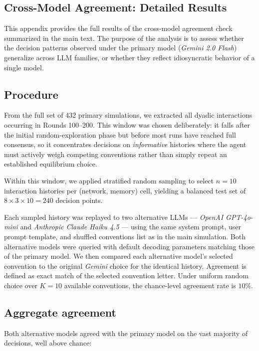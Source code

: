 \documentclass{article}
\begin{document}
\begin{appendices}
\section{Cross-Model Agreement: Detailed Results}
\label{app:cross_model_agreement}

This appendix provides the full results of the cross-model agreement check summarized in the main text. The purpose of the analysis is to assess whether the decision patterns observed under the primary model (\textit{Gemini 2.0 Flash}) generalize across LLM families, or whether they reflect idiosyncratic behavior of a single model.

\subsection*{Procedure}

From the full set of 432 primary simulations, we extracted all dyadic interactions occurring in Rounds 100--200. This window was chosen deliberately: it falls after the initial random-exploration phase but before most runs have reached full consensus, so it concentrates decisions on \emph{informative} histories where the agent must actively weigh competing conventions rather than simply repeat an established equilibrium choice.

Within this window, we applied stratified random sampling to select $n=10$ interaction histories per (network, memory) cell, yielding a balanced test set of $8 \times 3 \times 10 = 240$ decision points.

Each sampled history was replayed to two alternative LLMs --- \textit{OpenAI GPT-4o-mini} and \textit{Anthropic Claude Haiku 4.5} --- using the same system prompt, user prompt template, and shuffled conventions list as in the main simulation. Both alternative models were queried with default decoding parameters matching those of the primary model. We then compared each alternative model's selected convention to the original \textit{Gemini} choice for the identical history. Agreement is defined as exact match of the selected convention letter. Under uniform random choice over $K=10$ available conventions, the chance-level agreement rate is $10\%$.

\subsection*{Aggregate agreement}

Both alternative models agreed with the primary model on the vast majority of decisions, well above chance:


\end{appendices}
\end{document}
